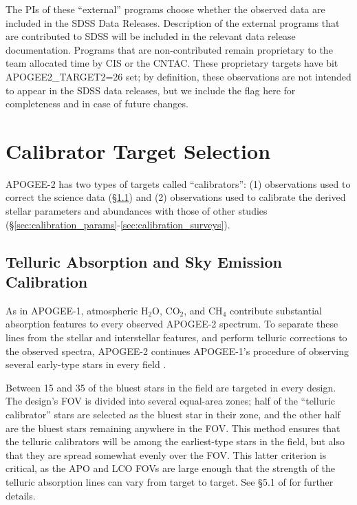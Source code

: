 \documentclass[12pt,twocolumn]{emulateapj}
\begin{document}
The PIs of these ``external'' programs choose whether the observed data are included in the SDSS Data Releases.  Description of the external programs that are contributed to SDSS will be included in the relevant data release documentation.  Programs that are non-contributed remain proprietary to the team allocated time by CIS or the CNTAC.  These proprietary targets have bit APOGEE2\_TARGET2=26 set; by definition, these observations are not intended to appear in the SDSS data releases, but we include the flag here for completeness and in case of future changes.

\section{Calibrator Target Selection}
\label{sec:calibration_targets}

APOGEE-2 has two types of targets called ``calibrators'': (1) observations used to correct the science data (\S\ref{sec:calibration_observation}) and (2) observations used to calibrate the derived stellar parameters and abundances with those of other studies (\S\ref{sec:calibration_params}-\ref{sec:calibration_surveys}).

\subsection{Telluric Absorption and Sky Emission Calibration}
\label{sec:calibration_observation}

As in APOGEE-1, atmospheric H$_2$O, CO$_2$, and CH$_4$ contribute substantial absorption features to every observed APOGEE-2 spectrum.  To separate these lines from the stellar and interstellar features, and perform telluric corrections to the observed spectra, APOGEE-2 continues APOGEE-1's procedure of observing several early-type stars in every field \citep[\S5.1 of][]{Zasowski_2013_apogeetargeting}.  

Between 15 and 35 of the bluest stars in the field are targeted in every design.  The design's FOV is divided into several equal-area zones; half of the ``telluric calibrator'' stars are selected as the bluest star in their zone, and the other half are the bluest stars remaining anywhere in the FOV.  This method ensures that the telluric calibrators will be among the earliest-type stars in the field, but also that they are spread somewhat evenly over the FOV.  This latter criterion is critical, as the APO and LCO FOVs are large enough that the strength of the telluric absorption lines can vary from target to target.  See \S5.1 of \citet{Zasowski_2013_apogeetargeting} for further details.
\end{document}
